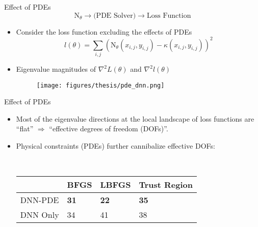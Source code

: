 \documentclass[usenames,dvipsnames]{beamer}
\begin{document}
\begin{frame}{Effect of PDEs}
	$$\text{N}_\theta \rightarrow \text{(PDE Solver)}  \rightarrow \text{Loss Function}$$
	\vspace{-0.5cm}
	\begin{itemize}
\item Consider the loss function excluding the effects of PDEs 
$$    l(\theta) = \sum_{i,j} (\text{N}_\theta(x_{i,j}, y_{i,j}) - \kappa(x_{i,j}, y_{i,j}))^2 $$

\item Eigenvalue magnitudes of $\nabla^2 L(\theta)$ and $\nabla^2 l(\theta)$
	\begin{figure}[htbp]
	\centering
	\texttt{[image: figures/thesis/pde\_dnn.png]}
\end{figure}
	\end{itemize}
\end{frame}

\begin{frame}{Effect of PDEs}
\begin{itemize}
\item Most of the eigenvalue directions at the local landscape of loss functions are ``flat'' $\Rightarrow$ ``effective degrees of freedom (DOFs)''. 

\item Physical constraints (PDEs) further cannibalize effective DOFs:

\

\begin{center}
		\begin{tabular}{@{}llll@{}}
		\toprule
		& BFGS & LBFGS & Trust Region \\ \midrule
		DNN-PDE     & \textbf{31}   & \textbf{22}    & \textbf{35}           \\
		DNN Only &  34   & 41    & 38           \\ \bottomrule
	\end{tabular}
\end{center}


\end{itemize}
\end{frame}
\end{document}
